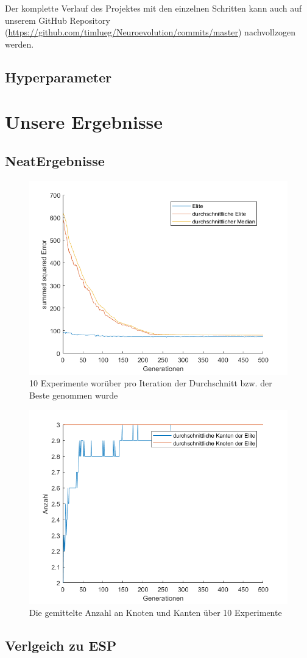 \documentclass{hbrs-ecta-report}
\begin{document}
Der komplette Verlauf des Projektes mit den einzelnen Schritten kann auch auf unserem GitHub Repository (\url{https://github.com/timlueg/Neuroevolution/commits/master}) nachvollzogen werden. 



\subsection{Hyperparameter}\label{sec:parameter}

\section{Unsere Ergebnisse}
\subsection{NeatErgebnisse}
\begin{figure}[h!]
	\includegraphics[width=\linewidth]{img/NeatElite}
	\caption{10 Experimente worüber pro Iteration der Durchschnitt bzw. der Beste genommen wurde}
	\label{fig:NeatElite}
\end{figure}
\begin{figure}[h!]
	\includegraphics[width=\linewidth]{img/KantenUndKnoten}
	\caption{Die gemittelte Anzahl an Knoten und Kanten über 10 Experimente}
	\label{fig:KantenUndKnoten}
\end{figure}
\subsection{Verlgeich zu ESP}
\end{document}
